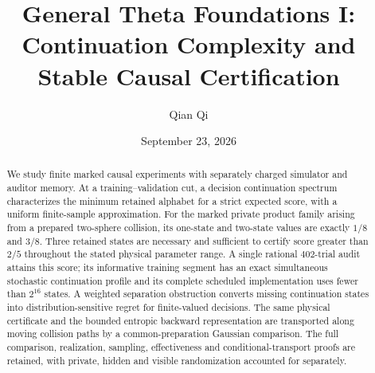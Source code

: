 
\usepackage{tikz}
\usetikzlibrary{arrows.meta,positioning}
\newcommand{\Wone}{W_1}
\newcommand{\Del}{\Delta}
\newcommand{\emptyw}{\varnothing}
\newcommand{\osc}{\operatorname{osc}}
\newcommand{\diam}{\operatorname{diam}}
\newcommand{\Lipone}{\operatorname{Lip}_1}
\newcommand{\aff}{\operatorname{aff}}
\newcommand{\conv}{\operatorname{conv}}
\newcommand{\rplus}{\operatorname{rank}_{+}}
\newcommand{\dpr}{\delta^{\rm p}}
\newcommand{\dhi}{\delta^{\rm h}}
\newcommand{\dvi}{\delta^{\rm v}}
\newcommand{\dmix}{\delta^{\rm mix}}
\newcommand{\cK}{\mathcal K}
\newcommand{\cB}{\mathcal B}
\newcommand{\cI}{\mathcal I}
\newcommand{\KL}{\operatorname{KL}}
\newcommand{\vaudit}{v^{\rm aud}}
\title[General Theta Foundations I]{General Theta Foundations I:\\Continuation Complexity and Stable Causal Certification}
\author{Qian Qi}
\date{September 23, 2026}

\begin{abstract}
We study finite marked causal experiments with separately charged simulator
and auditor memory. At a training--validation cut, a decision continuation
spectrum characterizes the minimum retained alphabet for a strict expected
score, with a uniform finite-sample approximation. For the marked private
product family arising from a prepared two-sphere collision, its one-state
and two-state values are exactly $1/8$ and $3/8$. Three retained states are
necessary and sufficient to certify score greater than $2/5$ throughout
the stated physical parameter range. A single rational $402$-trial audit
attains this score; its informative training segment has an exact
simultaneous stochastic continuation profile and its complete scheduled
implementation uses fewer than $2^{16}$ states. A weighted separation
obstruction converts missing continuation states into distribution-sensitive
regret for finite-valued decisions. The same physical certificate and the
bounded entropic backward representation are transported along moving
collision paths by a common-preparation Gaussian comparison. The full
comparison, realization, sampling, effectiveness and conditional-transport
proofs are retained, with private, hidden and visible randomization
accounted for separately.
\end{abstract}
\maketitle
\tableofcontents

